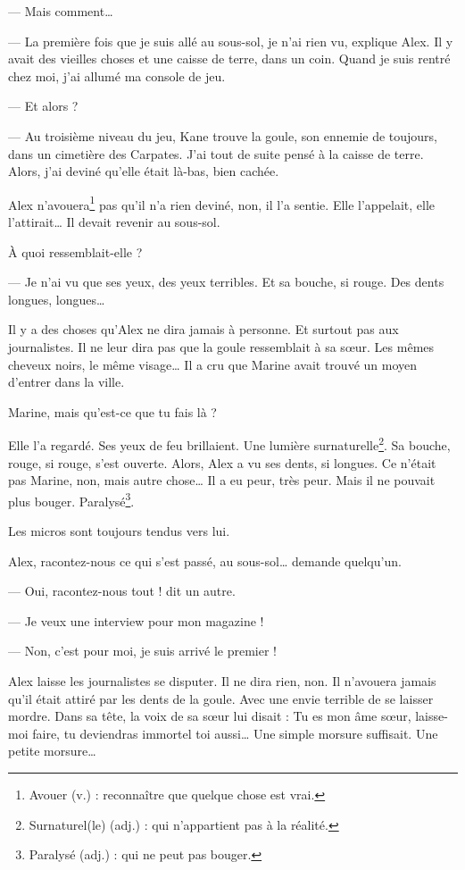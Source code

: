 --- Mais comment\ldots{}

--- La première fois que je suis allé au sous-sol, je n'ai rien vu, explique Alex. Il y avait des vieilles choses et une caisse
    de terre, dans un coin. Quand je suis rentré chez moi, j'ai allumé ma console de jeu.

--- Et alors ?

--- Au troisième niveau du jeu, Kane trouve la goule, son ennemie de toujours, dans un cimetière des Carpates. J'ai tout de suite
    pensé à la caisse de terre. Alors, j'ai deviné qu'elle était là-bas, bien cachée. \fg{}

Alex n'avouera\footnote{Avouer (v.) : reconnaître que quelque chose est vrai.} pas qu'il n'a rien deviné, non, il l'a sentie. Elle
l'appelait, elle l'attirait\ldots{} Il devait revenir au sous-sol.

\og À quoi ressemblait-elle ?

--- Je n'ai vu que ses yeux, des yeux terribles. Et sa bouche, si rouge. Des dents longues, longues\ldots{} \fg{}

Il y a des choses qu'Alex ne dira jamais à personne. Et surtout pas aux journalistes. Il ne leur dira pas que la goule ressemblait
à sa s\oe{}ur. Les mêmes cheveux noirs, le même visage\ldots{} Il a cru que Marine avait trouvé un moyen d'entrer dans la ville.

\og Marine, mais qu'est-ce que tu fais là ? \fg{}

Elle l'a regardé. Ses yeux de feu brillaient. Une lumière surnaturelle\footnote{Surnaturel(le) (adj.) : qui n'appartient pas à la
réalité.}. Sa bouche, rouge, si rouge, s'est ouverte. Alors, Alex a vu ses dents, si longues. Ce n'était pas Marine, non, mais
autre chose\ldots{} Il a eu peur, très peur. Mais il ne pouvait plus bouger. Paralysé\footnote{Paralysé (adj.) : qui ne peut pas
bouger.}.

Les micros sont toujours tendus vers lui.

\og Alex, racontez-nous ce qui s'est passé, au sous-sol\ldots{} demande quelqu'un.

--- Oui, racontez-nous tout ! dit un autre.

--- Je veux une interview pour mon magazine !

--- Non, c'est pour moi, je suis arrivé le premier ! \fg{}

Alex laisse les journalistes se disputer. Il ne dira rien, non. Il n'avouera jamais qu'il était attiré par les dents de la goule.
Avec une envie terrible de se laisser mordre. Dans sa tête, la voix de sa s\oe{}ur lui disait : \og Tu es mon âme s\oe{}ur,
laisse-moi faire, tu deviendras immortel toi aussi\ldots{} \fg{} Une simple morsure suffisait. Une petite morsure\ldots{}

